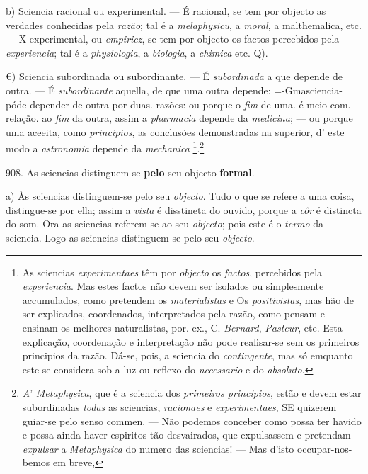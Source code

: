 b) Sciencia racional ou experimental. --- É racional, se tem por objecto as verdades conhecidas pela \emph{razão}; tal é a \emph{melaphysicu}, a \emph{moral}, a malthemalica, etc. --- X experimental, ou \emph{empiricz}, se tem por objecto os factos percebidos pela \emph{experiencia}; tal é a \emph{physiologia}, a \emph{biologia}, a \emph{chimica} etc. Q).

€) Sciencia subordinada ou subordinante. --- É \emph{subordinada} a que depende de outra. --- É \emph{subordinante} aquella, de que uma outra depende: =-Gmasciencia-póde-depender-de-outra-por duas. razões: ou porque o \emph{fim} de uma. é meio com. relação. ao \emph{fim} da outra, assim a \emph{pharmacia} depende da \emph{medicina}; --- ou porque uma aceeita, como \emph{principios}, as conclusões demonstradas na superior, d' este modo a \emph{astronomia} depende da \emph{mechanica} \footnote{As sciencias \emph{experimentaes} têm por \emph{objecto} os \emph{factos}, percebidos pela \emph{experiencia}. Mas estes factos não devem ser isolados ou simplesmente accumulados, como pretendem os \emph{materialistas} e Os \emph{positivistas}, mas hão de ser explicados, coordenados, interpretados pela razão, como pensam e ensinam os melhores naturalistas, por. ex., C. \emph{Bernard}, \emph{Pasteur}, ete. Esta explicação, coordenação e interpretação não pode realisar-se sem os primeiros principios da razão. Dá-se, pois, a sciencia do \emph{contingente}, mas só emquanto este se considera sob a luz ou reflexo do \emph{necessario} e do \emph{absoluto}.}.\footnote{\emph{A}' \emph{Metaphysica}, que é a sciencia dos \emph{primeiros principios}, estão e devem estar subordinadas \emph{todas} as sciencias, \emph{racionaes} e \emph{experimentaes}, SE quizerem guiar-se pelo senso commen. --- Não podemos conceber como possa ter havido e possa ainda haver espiritos tão desvairados, que expulsassem e pretendam \emph{expulsar} a \emph{Metaphysica} do numero das sciencias! --- Mas d'isto occupar-nos-bemos em breve,}

908. As sciencias distinguem-se \textbf{pelo} seu objecto \textbf{formal}.

a) Às sciencias distinguem-se pelo seu \emph{objecto}. Tudo o que se refere a uma coisa, distingue-se por ella; assim a \emph{vista} é disstineta do ouvido, porque a \emph{côr} é distincta do som. Ora as sciencias referem-se ao seu \emph{objecto}; pois este é o \emph{termo} da sciencia. Logo as sciencias distinguem-se pelo seu \emph{objecto}.

